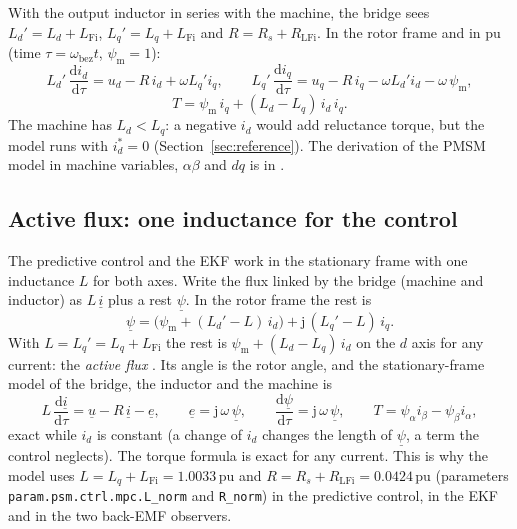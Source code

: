 \documentclass[11pt,a4paper]{scrartcl}
\newcommand{\ped}[1]{_{\mathrm{#1}}}
\newcommand{\code}[1]{\texttt{#1}}
\newcommand{\pun}{\,\mathrm{pu}}
\newcommand{\jj}{\mathrm{j}}
\begin{document}
\begin{onehalfspace}
With the output inductor in series with the machine, the bridge sees $L_d' = L_d + L\ped{Fi}$, $L_q' = L_q + L\ped{Fi}$ and $R = R_s + R\ped{LFi}$. In the rotor frame and in pu (time $\tau = \omega\ped{bez}t$, $\psi\ped{m} = 1$):
\begin{equation}
	L_d'\,\frac{\mathrm{d}i_d}{\mathrm{d}\tau} = u_d - R\,i_d + \omega L_q' i_q, \qquad
	L_q'\,\frac{\mathrm{d}i_q}{\mathrm{d}\tau} = u_q - R\,i_q - \omega L_d' i_d - \omega\,\psi\ped{m},
	\label{eq:dq}
\end{equation}
\begin{equation}
	T = \psi\ped{m}\,i_q + (L_d - L_q)\,i_d\,i_q .
	\label{eq:torque}
\end{equation}
The machine has $L_d < L_q$: a negative $i_d$ would add reluctance torque, but the model runs with $i_d^* = 0$ (Section~\ref{sec:reference}). The derivation of the PMSM model in machine variables, $\alpha\beta$ and $dq$ is in \cite{psm_note}.

\subsection{Active flux: one inductance for the control}
\label{sec:activeflux}

The predictive control and the EKF work in the stationary frame with one inductance $L$ for both axes. Write the flux linked by the bridge (machine and inductor) as $L\,\underline{i}$ plus a rest $\underline{\psi}$. In the rotor frame the rest is
\begin{equation}
	\underline{\psi} = \big(\psi\ped{m} + (L_d' - L)\,i_d\big) + \jj\,(L_q' - L)\,i_q .
	\label{eq:restflux}
\end{equation}
With $L = L_q' = L_q + L\ped{Fi}$ the rest is $\psi\ped{m} + (L_d - L_q)\,i_d$ on the $d$ axis for any current: the \emph{active flux} \cite{boldea2008}. Its angle is the rotor angle, and the stationary-frame model of the bridge, the inductor and the machine is
\begin{equation}
	L\,\frac{\mathrm{d}\underline{i}}{\mathrm{d}\tau} = \underline{u} - R\,\underline{i} - \underline{e}, \qquad
	\underline{e} = \jj\,\omega\,\underline{\psi}, \qquad
	\frac{\mathrm{d}\underline{\psi}}{\mathrm{d}\tau} = \jj\,\omega\,\underline{\psi}, \qquad
	T = \psi_\alpha i_\beta - \psi_\beta i_\alpha ,
	\label{eq:ab}
\end{equation}
exact while $i_d$ is constant (a change of $i_d$ changes the length of $\underline{\psi}$, a term the control neglects). The torque formula is exact for any current. This is why the model uses $L = L_q + L\ped{Fi} = 1.0033\pun$ and $R = R_s + R\ped{LFi} = 0.0424\pun$ (parameters \code{param.psm.ctrl.mpc.L\_norm} and \code{R\_norm}) in the predictive control, in the EKF and in the two back-EMF observers.


\end{onehalfspace}
\end{document}
